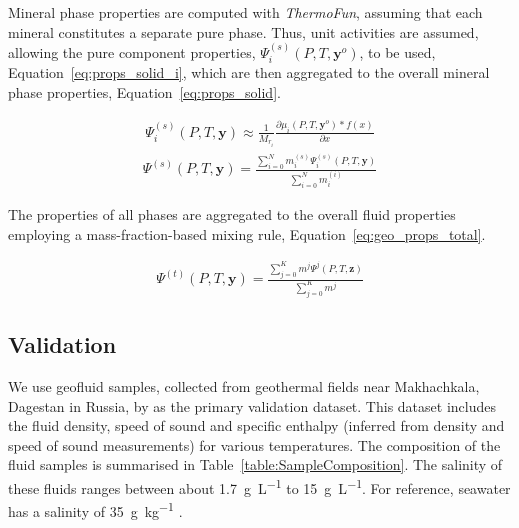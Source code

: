     Mineral phase properties are computed with \emph{ThermoFun}, assuming that each mineral constitutes a separate pure phase. Thus, unit activities are assumed, allowing the pure component properties, \(\Psi_i^{(s)} (P, T, \mathbf{y}^o)\), to be used, Equation~\ref{eq:props_solid_i}, which are then aggregated to the overall mineral phase properties, Equation~\ref{eq:props_solid}.

    \begin{align}
        \Psi_i^{(s)} (P, T, \mathbf{y}) \approx \frac{1}{M_{r_i}} \frac{\partial \mu_i (P, T, \mathbf{y}^o)*f(x)}{\partial x} \label{eq:props_solid_i}
    \end{align}
    \begin{align}
        \Psi^{(s)} (P, T, \mathbf{y}) = \frac{\sum_{i=0}^N m_i^{(s)} \Psi_i^{(s)} (P, T, \mathbf{y})}{\sum_{i=0}^N m_i^{(i)}} \label{eq:props_solid}
    \end{align}

    The properties of all phases are aggregated to the overall fluid properties employing a mass-fraction-based mixing rule, Equation~\ref{eq:geo_props_total}. 
    
    \begin{align}
        \Psi^{(t)} (P, T, \mathbf{y}) = \frac{\sum_{j=0}^K m^j \Psi^j (P, T, \mathbf{z})}{\sum_{j=0}^K m^j} \label{eq:geo_props_total}
    \end{align}

\subsection{Validation}
\label{sec:tppm_geoprop_validation}
    We use geofluid samples, collected from geothermal fields near Makhachkala, Dagestan in Russia, by \citeauthor{Abdulagatov2016} as the primary validation dataset. This dataset includes the fluid density, speed of sound and specific enthalpy (inferred from density and speed of sound measurements) for various temperatures. The composition of the fluid samples is summarised in Table~\ref{table:SampleComposition}. The salinity of these fluids ranges between about \qty{1.7}{\g \per \L} to \qty{15}{\g \per \L}. For reference, seawater has a salinity of \qty{35}{\g\per\kg} \cite{Millero2008}.

    \begin{table}[H]
        \caption{The composition of the geothermal fluid samples near Makhachkala \cite{Abdulagatov2016} in \unit{\milli \g \per \L}. Species exclusively below the detection threshold of \qty{0.1}{\milli \g \per \L} have been omitted.}
        \centering
        
        \label{table:SampleComposition}
        \\[10pt]
    \end{table}

